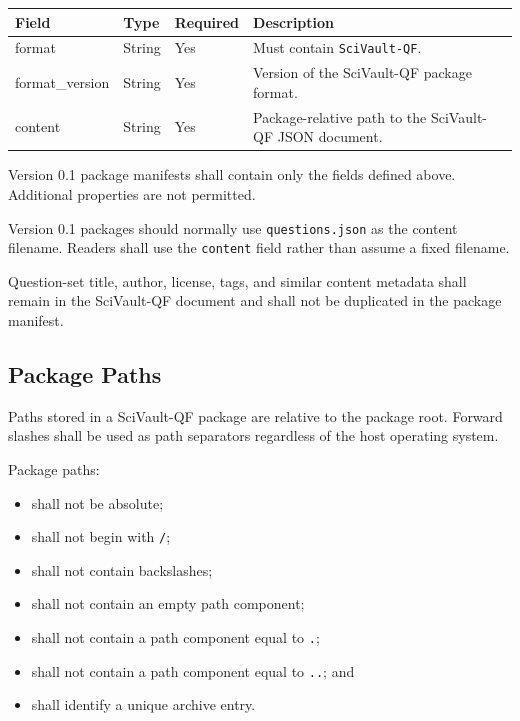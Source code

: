 \documentclass[11pt]{article}
\begin{document}
	\begin{longtable}{|>{\ttfamily}p{3.0cm}|p{2.0cm}|p{1.7cm}|p{7.5cm}|}
		\hline
		\textbf{Field} & \textbf{Type} & \textbf{Required} &
		\textbf{Description} \\ \hline
		\endfirsthead
		
		format & String & Yes &
		Must contain \texttt{SciVault-QF}. \\ \hline
		
		format\_version & String & Yes &
		Version of the SciVault-QF package format. \\ \hline
		
		content & String & Yes &
		Package-relative path to the SciVault-QF JSON document. \\ \hline
		
	\end{longtable}

	Version 0.1 package manifests shall contain only the fields defined above.
	Additional properties are not permitted.
	
	
	Version 0.1 packages should normally use \texttt{questions.json} as the
	content filename. Readers shall use the \texttt{content} field rather than
	assume a fixed filename.
	
	Question-set title, author, license, tags, and similar content metadata shall
	remain in the SciVault-QF document and shall not be duplicated in the package
	manifest.
	
	\subsection{Package Paths}
	
	Paths stored in a SciVault-QF package are relative to the package root.
	Forward slashes shall be used as path separators regardless of the host
	operating system.
	
Package paths:

\begin{itemize}
	\item shall not be absolute;
	\item shall not begin with \texttt{/};
	\item shall not contain backslashes;
	\item shall not contain an empty path component;
	\item shall not contain a path component equal to \texttt{.};
	\item shall not contain a path component equal to \texttt{..}; and
	\item shall identify a unique archive entry.
\end{itemize}
	
\end{document}
